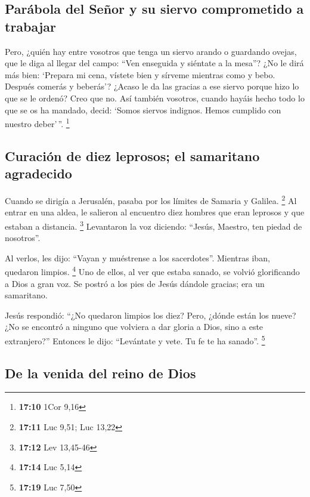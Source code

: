 \hypertarget{paruxe1bola-del-seuxf1or-y-su-siervo-comprometido-a-trabajar}{%
\subsection{Parábola del Señor y su siervo comprometido a
trabajar}\label{paruxe1bola-del-seuxf1or-y-su-siervo-comprometido-a-trabajar}}

 Pero, ¿quién hay entre vosotros que tenga un siervo
arando o guardando ovejas, que le diga al llegar del campo: ``Ven
enseguida y siéntate a la mesa''?  ¿No le dirá más bien:
`Prepara mi cena, vístete bien y sírveme mientras como y bebo. Después
comerás y beberás'?  ¿Acaso le da las gracias a ese siervo
porque hizo lo que se le ordenó? Creo que no.  Así
también vosotros, cuando hayáis hecho todo lo que se os ha mandado,
decid: `Somos siervos indignos. Hemos cumplido con nuestro deber'\,''.
\footnote{\textbf{17:10} 1Cor 9,16}

\hypertarget{curaciuxf3n-de-diez-leprosos-el-samaritano-agradecido}{%
\subsection{Curación de diez leprosos; el samaritano
agradecido}\label{curaciuxf3n-de-diez-leprosos-el-samaritano-agradecido}}

 Cuando se dirigía a Jerusalén, pasaba por los límites de
Samaria y Galilea. \footnote{\textbf{17:11} Luc 9,51; Luc 13,22}
 Al entrar en una aldea, le salieron al encuentro diez
hombres que eran leprosos y que estaban a distancia. \footnote{\textbf{17:12}
  Lev 13,45-46}  Levantaron la voz diciendo: ``Jesús,
Maestro, ten piedad de nosotros''.

 Al verlos, les dijo: ``Vayan y muéstrense a los
sacerdotes''. Mientras iban, quedaron limpios. \footnote{\textbf{17:14}
  Luc 5,14}  Uno de ellos, al ver que estaba sanado, se
volvió glorificando a Dios a gran voz.  Se postró a los
pies de Jesús dándole gracias; era un samaritano.

 Jesús respondió: ``¿No quedaron limpios los diez? Pero,
¿dónde están los nueve?  ¿No se encontró a ninguno que
volviera a dar gloria a Dios, sino a este extranjero?'' 
Entonces le dijo: ``Levántate y vete. Tu fe te ha sanado''. \footnote{\textbf{17:19}
  Luc 7,50}

\hypertarget{de-la-venida-del-reino-de-dios}{%
\subsection{De la venida del reino de
Dios}\label{de-la-venida-del-reino-de-dios}}

